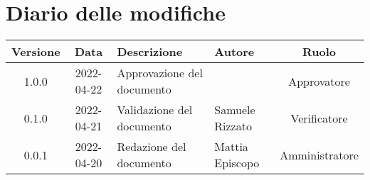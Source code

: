 \section*{Diario delle modifiche}
	\begin{center}
	\renewcommand{\arraystretch}{1.8}
	\begin{tabular}{ |c|c|m{12em}|m{7em}|c| }
	\hline
	\textbf{Versione} & \textbf{Data} & \textbf{Descrizione} &  \textbf{Autore} &  \textbf{Ruolo} \\
	\hline
	1.0.0 & 2022-04-22 & Approvazione del documento & \docApprovazione & Approvatore\\
	\hline
	0.1.0 & 2022-04-21 & Validazione del documento & Samuele \newline Rizzato & Verificatore\\
	\hline
    0.0.1 & 2022-04-20 & Redazione del documento & Mattia \newline Episcopo & Amministratore\\ 
	\hline
	\end{tabular}
	\end{center}
	\newpage